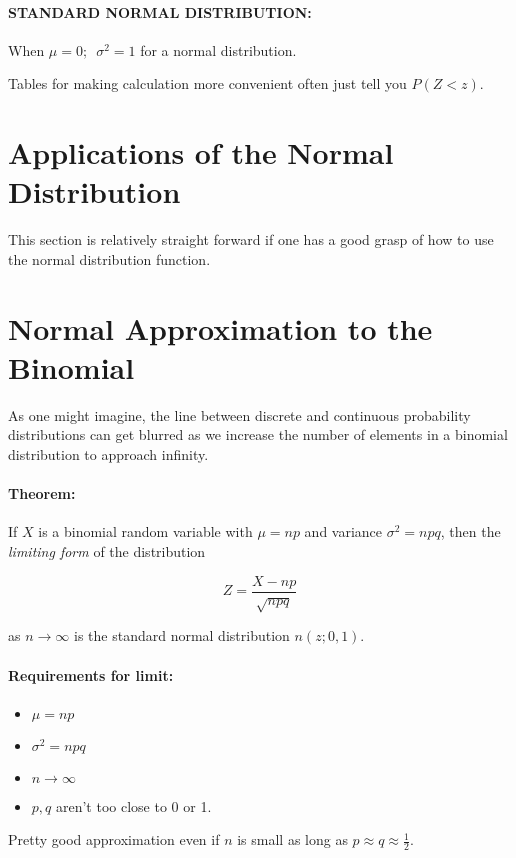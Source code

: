 \documentclass[a4paper,12pt]{report}
\begin{document}
\paragraph{STANDARD NORMAL DISTRIBUTION: } When $\mu = 0; \,\,\, \sigma^2 = 1$ for a normal distribution.

Tables for making calculation more convenient often just tell you $P(Z < z)$.


\section{Applications of the Normal Distribution}

This section is relatively straight forward if one has a good grasp of how to use the normal distribution function.

\section{Normal Approximation to the Binomial}

As one might imagine, the line between discrete and continuous probability distributions can get blurred as we increase the number of elements in a binomial distribution to approach infinity.

\paragraph{Theorem: } If $X$ is a binomial random variable with $\mu = np$ and variance $\sigma^2 = npq$, then the \textit{limiting form} of the distribution 

$$Z = \frac{X - np}{\sqrt{npq}}$$

as $n \to \infty$ is the standard normal distribution $n(z; 0, 1)$.

\paragraph{Requirements for limit: } 
\begin{itemize}
\item $\mu = np$
\item $\sigma^2 = npq$
\item $n \to \infty$
\item $p, q$ aren't too close to 0 or 1. 
\end{itemize}

Pretty good approximation even if $n$ is small as long as $p \approx q \approx \frac{1}{2}$.
\end{document}
